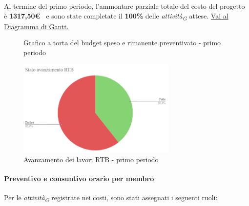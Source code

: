 Al termine del primo periodo, l'ammontare parziale totale del costo del progetto è \textbf{ 1317,50\euro\ } e sono state completate il \textbf{100\%} delle \textit{attività}\textsubscript{\textit{G}} attese.
\href{https://github.com/orgs/ByteOps-swe/projects/3/views/1?sortedBy%5Bdirection%5D=asc&sortedBy%5BcolumnId%5D=64182560}{Vai al Diagramma di Gantt.}
\hspace{1pt}
  \begin{figure}[H]
    \centering
    \begin{minipage}[b]{0.45\textwidth}
        \centering
        \caption{Grafico a torta del budget speso e rimanente preventivato - primo periodo}
        \label{fig:Budget_speso_1}
    \end{minipage}
    
    \vspace{1cm}

    \begin{minipage}[b]{0.70\textwidth}
        \centering
        \includegraphics[width=0.7\textwidth]{../Images/avanzamento1Periodo.png}
        \caption{Avanzamento dei lavori RTB - primo periodo}
        \label{fig:Avanzamento_RTB_1}
    \end{minipage}
\end{figure}

\paragraph{Preventivo e consuntivo orario per membro}
Per le \textit{attività}\textsubscript{\textit{G}} registrate nei costi, sono stati assegnati i seguenti ruoli: 

